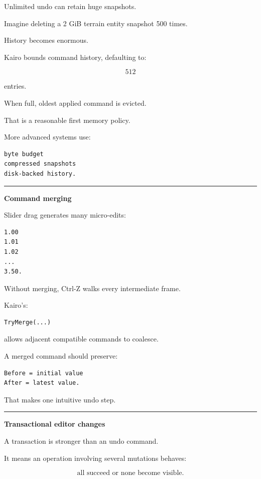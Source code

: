 Unlimited undo can retain huge snapshots.

Imagine deleting a 2 GiB terrain entity snapshot 500 times.

History becomes enormous.

Kairo bounds command history, defaulting to:

\[
512
\]

entries.

When full, oldest applied command is evicted.

That is a reasonable first memory policy.

More advanced systems use:

\begin{verbatim}
byte budget
compressed snapshots
disk-backed history.
\end{verbatim}

\begin{center}\rule{0.5\linewidth}{0.5pt}\end{center}

\textbf{Command merging}

Slider drag generates many micro-edits:

\begin{verbatim}
1.00
1.01
1.02
...
3.50.
\end{verbatim}

Without merging, Ctrl-Z walks every intermediate frame.

Kairo's:

\begin{verbatim}
TryMerge(...)
\end{verbatim}

allows adjacent compatible commands to coalesce.

A merged command should preserve:

\begin{verbatim}
Before = initial value
After = latest value.
\end{verbatim}

That makes one intuitive undo step.

\begin{center}\rule{0.5\linewidth}{0.5pt}\end{center}

\textbf{Transactional editor changes}

A transaction is stronger than an undo command.

It means an operation involving several mutations behaves:

\[
\boxed{
\text{all succeed or none become visible}.
}
\]

